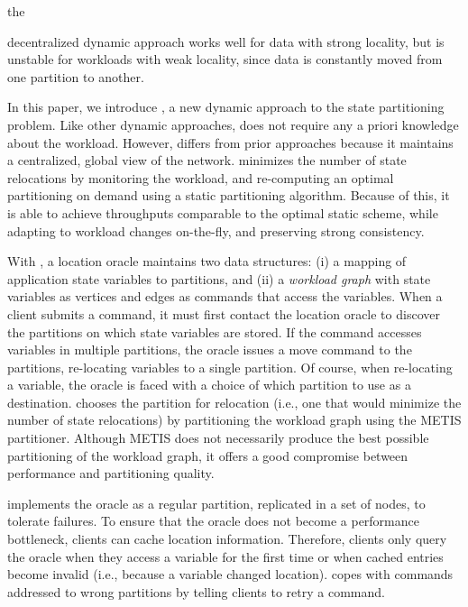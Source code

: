 the {decentralized dynamic approach works well for data with strong
  locality, but is unstable for workloads with weak locality, since
  data is constantly moved from one partition to another.


In this paper, we introduce \dynastar, a new dynamic approach to the
state partitioning problem.  Like other dynamic approaches, \dynastar
does not require any a priori knowledge about the workload. However,
\dynastar differs from prior approaches because it maintains a
centralized, global view of the network.  \dynastar minimizes the
number of state relocations by monitoring the workload, and
re-computing an optimal partitioning on demand using a static
partitioning algorithm. Because of this, \dynastar it is able to
achieve throughputs comparable to the optimal static scheme, while
adapting to workload changes on-the-fly, and preserving strong
consistency.


With \dynastar, a location oracle maintains two data structures: (i) a
mapping of application state variables to partitions, and (ii) a \emph{workload graph}
with state variables as vertices and edges as commands that access the
variables.  When a client submits a command, it must first contact the
location oracle to discover the partitions on which state variables are
stored.  If the command accesses variables in multiple partitions, the
oracle issues a move command to the partitions, re-locating variables to
a single partition. Of course, when re-locating a variable, the oracle
is faced with a choice of which partition to use as a destination.
\dynastar chooses the partition for relocation (i.e., one that
would minimize the number of state relocations) by partitioning the
workload graph using the METIS partitioner.
Although METIS does not necessarily produce the best possible partitioning of the workload graph, it offers a good compromise between performance and partitioning quality.

\dynastar implements the oracle as a regular partition, replicated in a set of nodes, to tolerate failures.
To ensure that the oracle does not become a performance bottleneck, clients can cache location information.
Therefore, clients only query the oracle when they access a variable for the first time or when cached entries become invalid (i.e., because a variable changed location).
\dynastar copes with commands addressed to wrong partitions by telling clients to retry a command.


}
